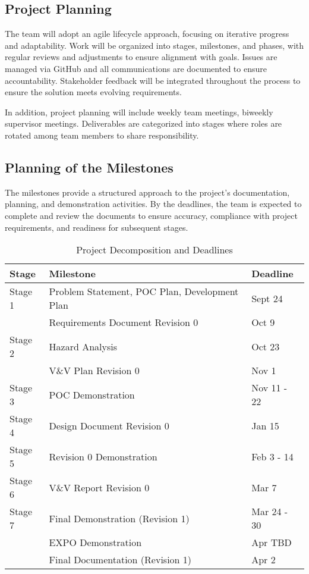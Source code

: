 \documentclass[12pt]{article}
\begin{document}
\subsection{Project Planning}

The team will adopt an agile lifecycle approach, focusing on iterative progress
and adaptability. Work will be organized into stages, milestones, and phases,
with regular reviews and adjustments to ensure alignment with goals. Issues are
managed via GitHub and all communications are documented to ensure
accountability. Stakeholder feedback will be integrated throughout the process
to ensure the solution meets evolving requirements.

In addition, project planning will include weekly team meetings, biweekly
supervisor meetings. Deliverables are categorized into stages where roles are
rotated among team members to share responsibility.

\subsection{Planning of the Milestones}

The milestones provide a structured approach to the project's documentation,
planning, and demonstration activities. By the deadlines, the team is expected
to complete and review the documents to ensure accuracy, compliance with project
requirements, and readiness for subsequent stages.

\newpage
\begin{table}[htbp]
  \centering
  \begin{tabular}{|l|l|l|}
  \hline
  \textbf{Stage} & \textbf{Milestone} & \textbf{Deadline} \\
  \hline
  Stage 1 & Problem Statement, POC Plan, Development Plan & Sept 24 \\
  \texttt{} & Requirements Document Revision 0 & Oct 9 \\
  \hline
  Stage 2 & Hazard Analysis & Oct 23 \\
  \texttt{} & V\&V Plan Revision 0 & Nov 1 \\
  \hline
  Stage 3 & POC Demonstration & Nov 11 - 22 \\
  \hline
  Stage 4 & Design Document Revision 0 & Jan 15 \\
  \hline
  Stage 5 & Revision 0 Demonstration & Feb 3 - 14\\
  \hline
  Stage 6 & V\&V Report Revision 0 & Mar 7 \\
  \hline
  Stage 7 & Final Demonstration (Revision 1) & Mar 24 - 30\\
  \texttt{} & EXPO Demonstration & Apr TBD \\
  \texttt{} & Final Documentation (Revision 1) & Apr 2 \\
  \hline
  \end{tabular}
  \caption{Project Decomposition and Deadlines}
  \label{table:2}
\end{table}
\end{document}
